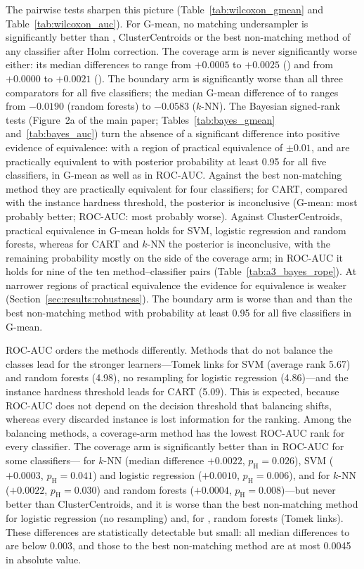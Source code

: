 The pairwise tests sharpen this picture (Table~\ref{tab:wilcoxon_gmean} and Table~\ref{tab:wilcoxon_auc}). For G-mean, no matching undersampler is significantly better than \RUS, ClusterCentroids or the best non-matching method of any classifier after Holm correction. The coverage arm is never significantly worse either: its median differences to \RUS{} range from $+0.0005$ to $+0.0025$ (\MUSCS) and from $+0.0000$ to $+0.0021$ (\MUSCO). The boundary arm is significantly worse than all three comparators for all five classifiers; the median G-mean difference of \MUSBS{} to \RUS{} ranges from $-0.0190$ (random forests) to $-0.0583$ ($k$-NN). The Bayesian signed-rank tests (Figure~2a of the main paper; Tables~\ref{tab:bayes_gmean} and~\ref{tab:bayes_auc}) turn the absence of a significant difference into positive evidence of equivalence: with a region of practical equivalence of $\pm0.01$, \MUSCS{} and \MUSCO{} are practically equivalent to \RUS{} with posterior probability at least 0.95 for all five classifiers, in G-mean as well as in ROC-AUC. Against the best non-matching method they are practically equivalent for four classifiers; for CART, compared with the instance hardness threshold, the posterior is inconclusive (G-mean: most probably better; ROC-AUC: most probably worse). Against ClusterCentroids, practical equivalence in G-mean holds for SVM, logistic regression and random forests, whereas for CART and $k$-NN the posterior is inconclusive, with the remaining probability mostly on the side of the coverage arm; in ROC-AUC it holds for nine of the ten method--classifier pairs (Table~\ref{tab:a3_bayes_rope}). At narrower regions of practical equivalence the evidence for equivalence is weaker (Section~\ref{sec:results:robustness}). The boundary arm is worse than \RUS{} and than the best non-matching method with probability at least 0.95 for all five classifiers in G-mean.

ROC-AUC orders the methods differently. Methods that do not balance the classes lead for the stronger learners---Tomek links for SVM (average rank 5.67) and random forests (4.98), no resampling for logistic regression (4.86)---and the instance hardness threshold leads for CART (5.09). This is expected, because ROC-AUC does not depend on the decision threshold that balancing shifts, whereas every discarded instance is lost information for the ranking. Among the balancing methods, a coverage-arm method has the lowest ROC-AUC rank for every classifier. The coverage arm is significantly better than \RUS{} in ROC-AUC for some classifiers---\MUSCS{} for $k$-NN (median difference $+0.0022$, $p_\mathrm{H}=0.026$), SVM ($+0.0003$, $p_\mathrm{H}=0.041$) and logistic regression ($+0.0010$, $p_\mathrm{H}=0.006$), and \MUSCO{} for $k$-NN ($+0.0022$, $p_\mathrm{H}=0.030$) and random forests ($+0.0004$, $p_\mathrm{H}=0.008$)---but never better than ClusterCentroids, and it is worse than the best non-matching method for logistic regression (no resampling) and, for \MUSCS, random forests (Tomek links). These differences are statistically detectable but small: all median differences to \RUS{} are below 0.003, and those to the best non-matching method are at most 0.0045 in absolute value.

